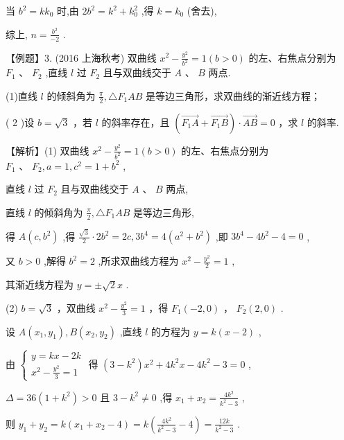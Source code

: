 \documentclass[10pt]{article}
\begin{document}
当 \({b}^{2} = k{k}_{0}\) 时,由 \(2{b}^{2} = {k}^{2} + {k}_{0}^{2}\) ,得 \(k = {k}_{0}\) (舍去),

综上, \(n = \frac{{b}^{2}}{-2}\) .

【例题】3. (2016 上海秋考) 双曲线 \({x}^{2} - \frac{{y}^{2}}{{b}^{2}} = 1\left( {b > 0}\right)\) 的左、右焦点分别为 \({F}_{1}\text{ 、 }{F}_{2}\) ,直线 \(l\) 过 \({F}_{2}\) 且与双曲线交于 \(A\text{ 、 }B\) 两点.

(1)直线 \(l\) 的倾斜角为 \(\frac{\pi }{2},\bigtriangleup {F}_{1}{AB}\) 是等边三角形，求双曲线的渐近线方程；

( 2 )设 \(b = \sqrt{3}\) ，若 \(l\) 的斜率存在，且 \(\left( {\overrightarrow{{F}_{1}A} + \overrightarrow{{F}_{1}B}}\right)  \cdot  \overrightarrow{AB} = 0\) ，求 \(l\) 的斜率.

【解析】(1) 双曲线 \({x}^{2} - \frac{{y}^{2}}{{b}^{2}} = 1\left( {b > 0}\right)\) 的左、右焦点分别为 \({F}_{1}\text{ 、 }{F}_{2},a = 1,{c}^{2} = 1 + {b}^{2}\) ,

直线 \(l\) 过 \({F}_{2}\) 且与双曲线交于 \(A\text{ 、 }B\) 两点,

直线 \(l\) 的倾斜角为 \(\frac{\pi }{2},\bigtriangleup {F}_{1}{AB}\) 是等边三角形,

得 \(A\left( {c,{b}^{2}}\right)\) ,得 \(\frac{\sqrt{3}}{2} \cdot  2{b}^{2} = {2c},3{b}^{4} = 4\left( {{a}^{2} + {b}^{2}}\right)\) ,即 \(3{b}^{4} - 4{b}^{2} - 4 = 0\) ,

又 \(b > 0\) ,解得 \({b}^{2} = 2\) ,所求双曲线方程为 \({x}^{2} - \frac{{y}^{2}}{2} = 1\) ,

其渐近线方程为 \(y =  \pm  \sqrt{2}x\) .

(2) \(b = \sqrt{3}\) ，双曲线 \({x}^{2} - \frac{{y}^{2}}{3} = 1\) ，得 \({F}_{1}\left( {-2,0}\right)\) ， \({F}_{2}\left( {2,0}\right)\) .

设 \(A\left( {{x}_{1},{y}_{1}}\right) ,B\left( {{x}_{2},{y}_{2}}\right)\) ,直线 \(l\) 的方程为 \(y = k\left( {x - 2}\right)\) ,

由 \(\left\{  \begin{array}{l} y = {kx} - {2k} \\  {x}^{2} - \frac{{y}^{2}}{3} = 1 \end{array}\right.\) 得 \(\left( {3 - {k}^{2}}\right) {x}^{2} + 4{k}^{2}x - 4{k}^{2} - 3 = 0\) ,

\(\Delta  = {36}\left( {1 + {k}^{2}}\right)  > 0\) 且 \(3 - {k}^{2} \neq  0\) ,得 \({x}_{1} + {x}_{2} = \frac{4{k}^{2}}{{k}^{2} - 3}\) ,

则 \({y}_{1} + {y}_{2} = k\left( {{x}_{1} + {x}_{2} - 4}\right)  = k\left( {\frac{4{k}^{2}}{{k}^{2} - 3} - 4}\right)  = \frac{12k}{{k}^{2} - 3}\) .
\end{document}
